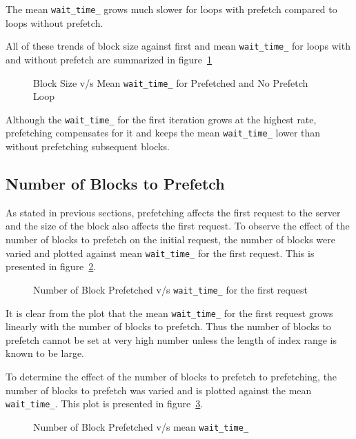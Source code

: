 The mean \texttt{wait\_time\_} grows much slower for loops with prefetch compared
to loops without prefetch.

All of these trends of block size against first and mean \texttt{wait\_time\_} for
loops with and without prefetch are summarized in figure~\ref{fig:block_size_avg_all}
\begin{figure}[h]
  
  \caption{Block Size v/s Mean \texttt{wait\_time\_} for Prefetched and No Prefetch Loop}
  \label{fig:block_size_avg_all}
\end{figure}

Although the \texttt{wait\_time\_} for the first iteration grows at the highest rate,
prefetching compensates for it and keeps the mean \texttt{wait\_time\_} lower than
without prefetching subsequent blocks.

\subsection{Number of Blocks to Prefetch}
As stated in previous sections, prefetching affects the first request to the server
and the size of the block also affects the first request. To observe the effect of
the number of blocks to prefetch on the initial request, the number of blocks were
varied and plotted against mean \texttt{wait\_time\_} for the first request. This is
presented in figure~\ref{fig:look_ahead_first_wait_time}.
\begin{figure}[h]
  
  \caption{Number of Block Prefetched v/s \texttt{wait\_time\_} for the first request}
  \label{fig:look_ahead_first_wait_time}
\end{figure}

It is clear from the plot that the mean \texttt{wait\_time\_} for the first request
grows linearly with the number of blocks to prefetch. Thus the number of blocks
to prefetch cannot be set at very high number unless the length of index range is
known to be large.

To determine the effect of the number of blocks to prefetch to prefetching, the number
of blocks to prefetch was varied and is plotted against the mean \texttt{wait\_time\_}.
This plot is presented in figure~\ref{fig:look_ahead_avg_wait_time}.
\begin{figure}[h]
  
  \caption{Number of Block Prefetched v/s mean \texttt{wait\_time\_}}
  \label{fig:look_ahead_avg_wait_time}
\end{figure}

